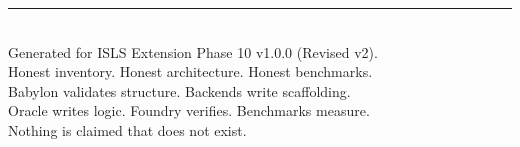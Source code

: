 \documentclass[11pt,a4paper,twoside]{article}
\theoremstyle{definition}
\theoremstyle{plain}
\theoremstyle{remark}
\newcommand{\ISLS}{\textsf{ISLS}}
\begin{document}
\vfill
\begin{center}
\rule{0.5\textwidth}{0.4pt}\\[0.5cm]
{\small Generated for \ISLS{} Extension Phase 10 v1.0.0 (Revised v2).\\[0.2cm]
Honest inventory. Honest architecture. Honest benchmarks.\\
Babylon validates structure. Backends write scaffolding.\\
Oracle writes logic. Foundry verifies. Benchmarks measure.\\
Nothing is claimed that does not exist.}
\end{center}
\end{document}
